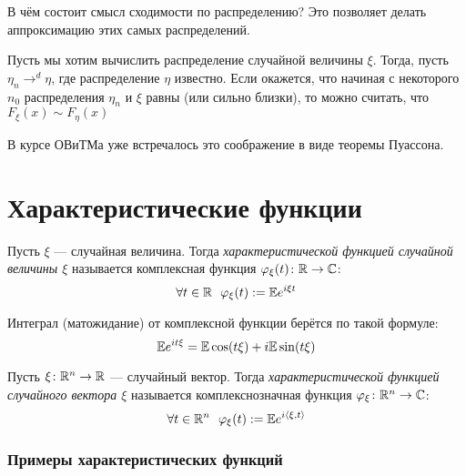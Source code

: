 \begin{note}
	В чём состоит смысл сходимости по распределению? Это позволяет делать аппроксимацию этих самых распределений.
	
	Пусть мы хотим вычислить распределение случайной величины $\xi$. Тогда, пусть $\eta_n \to^d \eta$, где распределение $\eta$ известно. Если окажется, что начиная с некоторого $n_0$ распределения $\eta_n$ и $\xi$ равны (или сильно близки), то можно считать, что $F_\xi(x) \sim F_\eta(x)$
\end{note}

\begin{example}
	В курсе ОВиТМа уже встречалось это соображение в виде теоремы Пуассона.
\end{example}

\section{Характеристические функции}

\begin{definition}
	Пусть $\xi$ --- случайная величина. Тогда \textit{характеристической функцией случайной величины $\xi$} называется комплексная функция $\varphi_\xi(t) \colon \mathbb{R} \to \mathbb{C}$:
	\[
		\forall t \in \mathbb{R}\ \ \varphi_\xi(t) := \mathbb{E} e^{i\xi t}
	\]
\end{definition}

\begin{note}
	Интеграл (матожидание) от комплексной функции берётся по такой формуле:
	\[
		\mathbb{E} e^{it\xi} = \mathbb{E}\cos(t\xi) + i\mathbb{E}\sin(t\xi)
	\]
\end{note}

\begin{definition}
	Пусть $\xi \colon \mathbb{R}^n \to \mathbb{R}$ --- случайный вектор. Тогда \textit{характеристической функцией случайного вектора $\xi$} называется комплекснозначная функция $\varphi_\xi \colon \mathbb{R}^n \to \mathbb{C}$:
	\[
		\forall t \in \mathbb{R}^n\ \ \varphi_\xi(t) := \mathbb{E} e^{i\left\langle\xi, t\right\rangle}
	\]
\end{definition}

\subsubsection*{Примеры характеристических функций}

